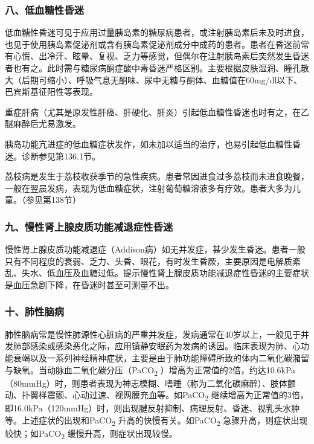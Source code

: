 \subsubsection{八、低血糖性昏迷}

低血糖性昏迷可见于应用过量胰岛素的糖尿病患者，或注射胰岛素后未及时进食，也见于使用胰岛素促泌剂或含有胰岛素促泌剂成分中成药的患者。患者在昏迷前常有心慌、出冷汗、眩晕、复视、乏力等感觉，但偶尔在注射胰岛素后突然发生昏迷者也有之。此时需与糖尿病酮症酸中毒昏迷严格区别。主要根据皮肤湿润、瞳孔散大（后期可缩小）、呼吸气息无酮味、尿中无糖与酮体、血糖值在60mg/dl以下、巴宾斯基征阳性等表现。

重症肝病（尤其是原发性肝癌、肝硬化、肝炎）引起低血糖性昏迷也时有之，在乙醚麻醉后尤易激发。

胰岛功能亢进症的低血糖症状发作，如未加以适当的治疗，也易引起低血糖性昏迷。诊断参见第136.1节。

荔枝病是发生于荔枝收获季节的急性疾病。患者常因进食过多荔枝而未进食晚餐，一般在翌晨发病，表现为低血糖症状，注射葡萄糖溶液多有疗效。患者大多为儿童。（参见第138节）

\subsubsection{九、慢性肾上腺皮质功能减退症性昏迷}

慢性肾上腺皮质功能减退症（Addison病）如无并发症，甚少发生昏迷。患者一般只有不同程度的衰弱、乏力、头昏、眼花，有时发生昏厥，主要原因是电解质紊乱、失水、低血压及血糖过低。提示慢性肾上腺皮质功能减退症性昏迷的主要症状是血压急剧下降，在昏迷时甚至可测量不出。

\subsubsection{十、肺性脑病}

肺性脑病常是慢性肺源性心脏病的严重并发症，发病通常在40岁以上，一般见于并发肺部感染或感染恶化之际，应用镇静安眠药为发病的诱因。临床表现为肺、心功能衰竭以及一系列神经精神症状，主要是由于肺功能障碍所致的体内二氧化碳潴留与缺氧。当动脉血二氧化碳分压（PaCO\textsubscript{2}
）增高为正常值的2倍，约达10.6kPa（80mmHg）时，则患者表现为神志模糊、嗜睡（称为二氧化碳麻醉）、肢体颤动、扑翼样震颤、心动过速、视网膜充血等。如PaCO\textsubscript{2}
继续增高为正常值的3倍，即16.0kPa（120mmHg）时，则出现腱反射抑制、病理反射、昏迷、视乳头水肿等。上述症状的出现和PaCO\textsubscript{2}
升高的快慢有关。如PaCO\textsubscript{2}
急骤升高，则症状出现较快；如PaCO\textsubscript{2}
缓慢升高，则症状出现较慢。

